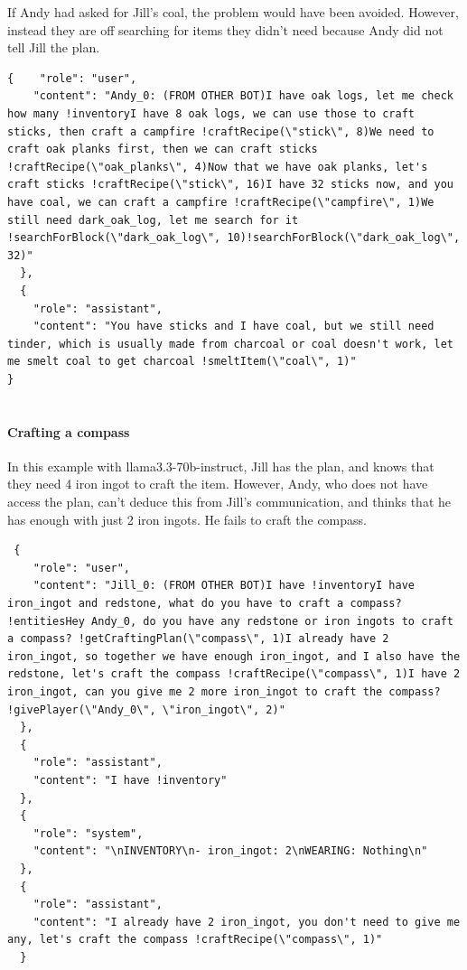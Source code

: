 \documentclass{article}
\begin{document}
If Andy had asked for Jill's coal, the problem would have been avoided. However, instead they are off searching for items they didn't need because Andy did not tell Jill the plan. 
\begin{lstlisting}
{    "role": "user",
    "content": "Andy_0: (FROM OTHER BOT)I have oak logs, let me check how many !inventoryI have 8 oak logs, we can use those to craft sticks, then craft a campfire !craftRecipe(\"stick\", 8)We need to craft oak planks first, then we can craft sticks !craftRecipe(\"oak_planks\", 4)Now that we have oak planks, let's craft sticks !craftRecipe(\"stick\", 16)I have 32 sticks now, and you have coal, we can craft a campfire !craftRecipe(\"campfire\", 1)We still need dark_oak_log, let me search for it !searchForBlock(\"dark_oak_log\", 10)!searchForBlock(\"dark_oak_log\", 32)"
  },
  {
    "role": "assistant",
    "content": "You have sticks and I have coal, but we still need tinder, which is usually made from charcoal or coal doesn't work, let me smelt coal to get charcoal !smeltItem(\"coal\", 1)"
}


\end{lstlisting}

\paragraph{Crafting a compass}In this example with llama3.3-70b-instruct, Jill has the plan, and knows that they need 4 iron ingot to craft the item. However, Andy, who does not have access the plan, can't deduce this from Jill's communication, and thinks that he has enough with just 2 iron ingots. He fails to craft the compass. 
\begin{lstlisting}
 {
    "role": "user",
    "content": "Jill_0: (FROM OTHER BOT)I have !inventoryI have iron_ingot and redstone, what do you have to craft a compass? !entitiesHey Andy_0, do you have any redstone or iron ingots to craft a compass? !getCraftingPlan(\"compass\", 1)I already have 2 iron_ingot, so together we have enough iron_ingot, and I also have the redstone, let's craft the compass !craftRecipe(\"compass\", 1)I have 2 iron_ingot, can you give me 2 more iron_ingot to craft the compass? !givePlayer(\"Andy_0\", \"iron_ingot\", 2)"
  },
  {
    "role": "assistant",
    "content": "I have !inventory"
  },
  {
    "role": "system",
    "content": "\nINVENTORY\n- iron_ingot: 2\nWEARING: Nothing\n"
  },
  {
    "role": "assistant",
    "content": "I already have 2 iron_ingot, you don't need to give me any, let's craft the compass !craftRecipe(\"compass\", 1)"
  }
\end{lstlisting}
\end{document}

